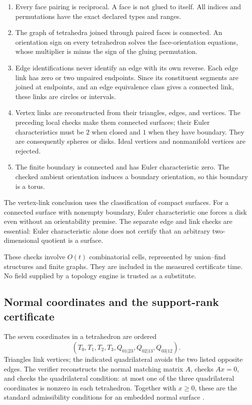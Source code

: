 \begin{enumerate}
\item Every face pairing is reciprocal. A face is not glued to itself.
All indices and permutations have the exact declared types and ranges.
\item The graph of tetrahedra joined through paired faces is connected.
An orientation sign on every tetrahedron solves the face-orientation
equations, whose multiplier is minus the sign of the gluing permutation.
\item Edge identifications never identify an edge with its own reverse.
Each edge link has zero or two unpaired endpoints. Since its constituent
segments are joined at endpoints, and an edge equivalence class gives a
connected link, these links are circles or intervals.
\item Vertex links are reconstructed from their triangles, edges, and
vertices. The preceding local checks make them connected surfaces; their
Euler characteristics must be $2$ when closed and $1$ when they have
boundary. They are consequently spheres or disks. Ideal vertices and
nonmanifold vertices are rejected.
\item The finite boundary is connected and has Euler characteristic zero.
The checked ambient orientation induces a boundary orientation, so this
boundary is a torus.
\end{enumerate}

The vertex-link conclusion uses the classification of compact surfaces.
For a connected surface with nonempty boundary, Euler characteristic one
forces a disk even without an orientability premise. The separate edge and
link checks are essential: Euler characteristic alone does not certify that
an arbitrary two-dimensional quotient is a surface.

These checks involve $O(t)$ combinatorial cells, represented by union--find
structures and finite graphs. They are included in the measured certificate
time. No field supplied by a topology engine is trusted as a substitute.

\subsection{Normal coordinates and the support-rank certificate}

The seven coordinates in a tetrahedron are ordered
\[
 (T_0,T_1,T_2,T_3,Q_{01|23},Q_{02|13},Q_{03|12}).
\]
Triangles link vertices; the indicated quadrilateral avoids the two listed
opposite edges. The verifier reconstructs the normal matching matrix $A$,
checks $Ax=0$, and checks the quadrilateral condition: at most one of the
three quadrilateral coordinates is nonzero in each tetrahedron. Together
with $x\geq0$, these are the standard admissibility conditions for an
embedded normal surface \cite{hlp,jaco-rubinstein}.

